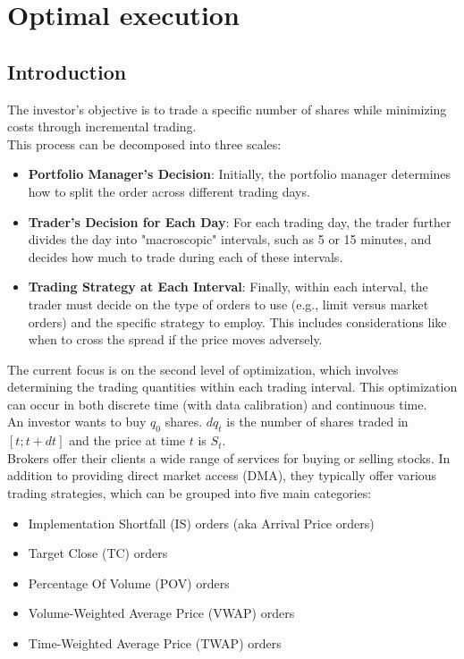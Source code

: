 \chapter{Optimal execution}
\label{chap:optimal_execution}
\section{Introduction}
The investor's objective is to trade a specific number of shares while minimizing costs through incremental trading.\\
This process can be decomposed into three scales:
\begin{itemize}
	\item \textbf{Portfolio Manager's Decision}: Initially, the portfolio manager determines how to split the order across different trading days. 
	\item \textbf{Trader's Decision for Each Day}: For each trading day, the trader further divides the day into "macroscopic" intervals, such as 5 or 15 minutes, and decides how much to trade during each of these intervals.
	\item \textbf{Trading Strategy at Each Interval}: Finally, within each interval, the trader must decide on the type of orders to use (e.g., limit versus market orders) and the specific strategy to employ. This includes considerations like when to cross the spread if the price moves adversely.
\end{itemize}
The current focus is on the second level of optimization, which involves determining the trading quantities within each trading interval. This optimization can occur in both discrete time (with data calibration) and continuous time.\\
An investor wants to buy $q_0$ shares. $dq_t$ is the number of shares traded in $[t; t + dt]$ and
the price at time $t$ is $S_t$.\\
Brokers offer their clients a wide range of services for buying or selling stocks. In addition to providing direct market access (DMA), they typically offer various trading strategies, which can be grouped into five main categories:
\begin{itemize}
	\item Implementation Shortfall (IS) orders (aka Arrival Price orders)
	\item Target Close (TC) orders
	\item Percentage Of Volume (POV) orders
	\item Volume-Weighted Average Price (VWAP) orders
	\item Time-Weighted Average Price (TWAP) orders
\end{itemize}
